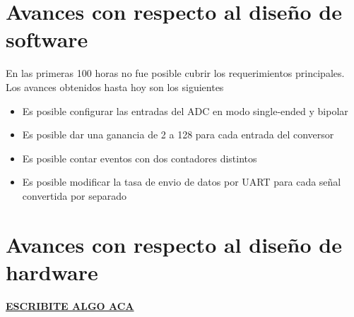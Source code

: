 \section{Avances con respecto al diseño de software} %
\label{sec:avances_con_respecto_al_diseno_de_software}

En las primeras 100 horas no fue posible cubrir los requerimientos principales. Los avances obtenidos hasta hoy son los siguientes

\begin{itemize}
  \item Es posible configurar las entradas del ADC en modo single-ended y bipolar
  \item Es posible dar una ganancia de 2 a 128 para cada entrada del conversor
  \item Es posible contar eventos con dos contadores distintos
  \item Es posible modificar la tasa de envio de datos por UART para cada se\~nal convertida por separado
\end{itemize}

\clearpage

\section{Avances con respecto al dise\~no de hardware} %
\label{sec:avances_con_respecto_al_diseno_de_hardware}

\textbf{\underline{ESCRIBITE ALGO ACA}}

